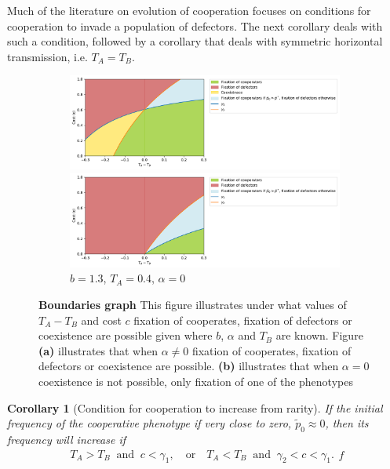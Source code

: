 \documentclass[12pt]{extarticle}
\newtheorem{corollary}{Corollary}
\begin{document}
{Much of the literature on evolution of cooperation focuses on conditions for cooperation to invade a population of defectors.
The next corollary deals with such a condition, followed by a corollary that deals with symmetric horizontal transmission, i.e. $T_A=T_B$.
\\

\begin{figure}[H]
  \centering
  \begin{subfigure}{8cm}
    \includegraphics[scale=0.5]{figure2a.pdf}
    \caption{$b=1.3$, $T_A=0.4$, $\alpha = 0.7$}
    \label{fig:results2_a}
    \includegraphics[scale=0.5]{figure2b.pdf}
    \caption{$b=1.3$, $T_A=0.4$, $\alpha = 0$}
    \label{fig:results2_b}
  \end{subfigure}
  \label{fig:results2}
  \caption{\textbf{Boundaries graph} This figure illustrates under what values of $T_A-T_B$ and cost $c$ fixation of cooperates, fixation of defectors or coexistence are possible given where $b$, $\alpha$ and $T_B$ are known.
    Figure \textbf{(a)} illustrates that when $\alpha \neq 0$ fixation of cooperates, fixation of defectors or coexistence are possible. \textbf{(b)} illustrates that when $\alpha=0$ coexistence is not possible, only fixation of one of the phenotypes}
\end{figure}

\begin{corollary}[Condition for cooperation to increase from rarity]
If the initial frequency of the cooperative phenotype if very close to zero, $\tilde{p}_0 \approx 0$, then its frequency will increase if 
\begin{equation} \label{eq:unequal_transmission_from_rarity}
\begin{aligned}
T_A>T_B \;\; \text{and} \;\; c < \gamma_1, \quad \text{or} \quad
T_A<T_B \;\; \text{and} \;\; \gamma_2<c < \gamma_1. 
\end{aligned}f
\end{equation} 
\end{corollary}

}
\end{document}
